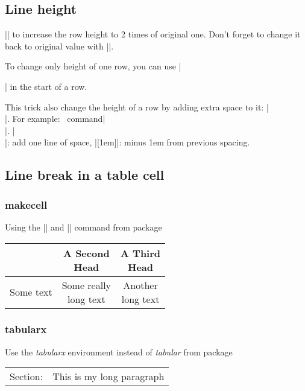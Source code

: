 \subsection{Line height}
\command|\renewcommand{\arraystretch}{2}| to increase the row height to 
2 times of original one. Don't forget to change it back to original value
with \command|\renewcommand{\arraystretch}{1}|. 

To change only height of one row, you can use \command|\rule{0pt}{height} | in the start of a row. 

This trick also change the height of a row by adding extra space to it: 
\command|\\[distance]|. For example: |\\[-1em]|. \command|\\|: add one line of space, 
\command|[\-1em]|: minus 1em from previous spacing.

\subsection{Line break in a table cell}

\subsubsection{makecell}
Using the \command|\thead| and \command|\makecell| command from package 

\renewcommand\theadalign{bc}
\renewcommand\theadfont{\bfseries}
\renewcommand\theadgape{\Gape[4pt]}
\renewcommand\cellgape{\Gape[4pt]}

\begin{center}
    \begin{tabular}{ | c | c | c |}
	\hline
	\thead{A Head}	& \thead{A Second \\ Head}  & \thead{A Third \\ Head}	\\
	\hline
	Some text   & \makecell{Some really \\ long text}   & \makecell{Another \\ long text}	\\
	\hline
    \end{tabular}
\end{center}

\subsubsection{tabularx}
Use the \emph{tabularx} environment instead of \emph{tabular} from package 
\begin{center}
    \begin{tabularx}{\textwidth}{lX}
	Section:    & This is my \newline 
		      long paragraph	\\
    \end{tabularx}
\end{center}





